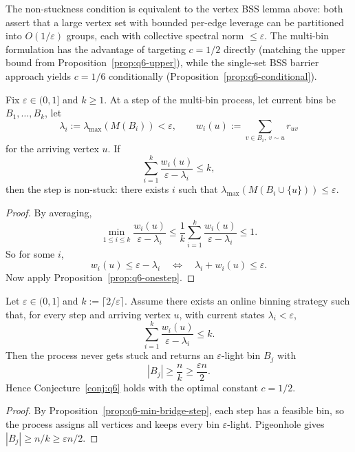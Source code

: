 \noindent
The non-stuckness condition is equivalent to the vertex BSS
lemma above: both assert that a large vertex set with bounded
per-edge leverage can be partitioned into $O(1/\varepsilon)$ groups,
each with collective spectral norm $\le\varepsilon$.
The multi-bin formulation has the advantage of targeting $c=1/2$ directly
(matching the upper bound from Proposition~\ref{prop:q6-upper}),
while the single-set BSS barrier approach yields $c=1/6$ conditionally
(Proposition~\ref{prop:q6-conditional}).

\begin{proposition}\label{prop:q6-min-bridge-step}
Fix $\varepsilon\in(0,1]$ and $k\ge 1$.
At a step of the multi-bin process, let current bins be $B_1,\dots,B_k$,
let
\[
\lambda_i:=\lambda_{\max}(M(B_i))<\varepsilon,
\qquad
w_i(u):=\sum_{v\in B_i,\ v\sim u} r_{uv}
\]
for the arriving vertex $u$.
If
\[
\sum_{i=1}^k \frac{w_i(u)}{\varepsilon-\lambda_i}\le k,
\]
then the step is non-stuck: there exists $i$ such that
$\lambda_{\max}(M(B_i\cup\{u\}))\le\varepsilon$.
\end{proposition}

\begin{proof}
By averaging,
\[
\min_{1\le i\le k}\frac{w_i(u)}{\varepsilon-\lambda_i}
\le
\frac1k\sum_{i=1}^k \frac{w_i(u)}{\varepsilon-\lambda_i}
\le 1.
\]
So for some $i$,
\[
w_i(u)\le \varepsilon-\lambda_i
\quad\Longleftrightarrow\quad
\lambda_i+w_i(u)\le\varepsilon.
\]
Now apply Proposition~\ref{prop:q6-onestep}.
\end{proof}

\begin{theorem}[Minimal bridge to $c=1/2$]\label{thm:q6-min-bridge}
Let $\varepsilon\in(0,1]$ and $k:=\lceil 2/\varepsilon\rceil$.
Assume there exists an online binning strategy such that, for every step
and arriving vertex $u$, with current states $\lambda_i<\varepsilon$,
\[
\sum_{i=1}^k \frac{w_i(u)}{\varepsilon-\lambda_i}\le k.
\]
Then the process never gets stuck and returns an $\varepsilon$-light bin
$B_j$ with
\[
|B_j|\ge \frac{n}{k}\ge \frac{\varepsilon n}{2}.
\]
Hence Conjecture~\ref{conj:q6} holds with the optimal constant $c=1/2$.
\end{theorem}

\begin{proof}
By Proposition~\ref{prop:q6-min-bridge-step}, each step has a feasible bin,
so the process assigns all vertices and keeps every bin $\varepsilon$-light.
Pigeonhole gives $|B_j|\ge n/k\ge \varepsilon n/2$.
\end{proof}

